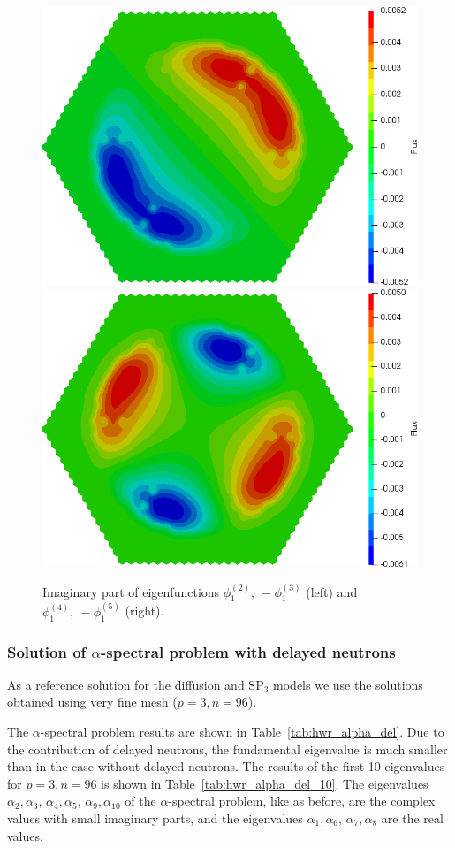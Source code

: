 \documentclass[authoryear]{elsarticle}
\begin{document}
\begin{figure}[H]
\begin{center}
	\includegraphics[width=0.49\linewidth]{hwr/alpha_sp3_cx1_2.png}
	\includegraphics[width=0.49\linewidth]{hwr/alpha_sp3_cx1_4.png}\\
	\caption{Imaginary part of eigenfunctions $\phi^{(2)}_1, \ - \phi^{(3)}_1$ (left) and $\phi^{(4)}_1, \ - \phi^{(5)}_1$ (right).}
	\label{fig:hwr_fun_3}
\end{center}
\end{figure}

\subsubsection{Solution of $\alpha$-spectral problem with delayed neutrons}

As a reference solution for the diffusion and $\mathrm{SP_3}$ models we use the solutions obtained using very fine mesh ($p = 3, n = 96$).

The $\alpha$-spectral problem results are shown in Table~\ref{tab:hwr_alpha_del}. 
Due to the contribution of delayed neutrons, the fundamental eigenvalue is much smaller than in the case without delayed neutrons.
The results of the first 10 eigenvalues for $p = 3, n = 96 $ is shown in Table~\ref{tab:hwr_alpha_del_10}.
The eigenvalues $\alpha_2, \alpha_3$, $\alpha_4, \alpha_5$, $\alpha_9, \alpha_{10}$ of the $\alpha$-spectral problem, like as before, are the complex values with small imaginary parts, and the eigenvalues $\alpha_1, \alpha_6$, $\alpha_7, \alpha_8$ are the real values.
\end{document}
